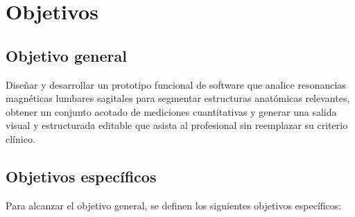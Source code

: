 \chapter{Objetivos}

\section{Objetivo general}

Dise\~nar y desarrollar un prototipo funcional de software que analice resonancias magn\'eticas lumbares sagitales para segmentar estructuras anat\'omicas relevantes, obtener un conjunto acotado de mediciones cuantitativas y generar una salida visual y estructurada editable que asista al profesional sin reemplazar su criterio cl\'inico.

\section{Objetivos espec\'ificos}

Para alcanzar el objetivo general, se definen los siguientes objetivos espec\'ificos:

